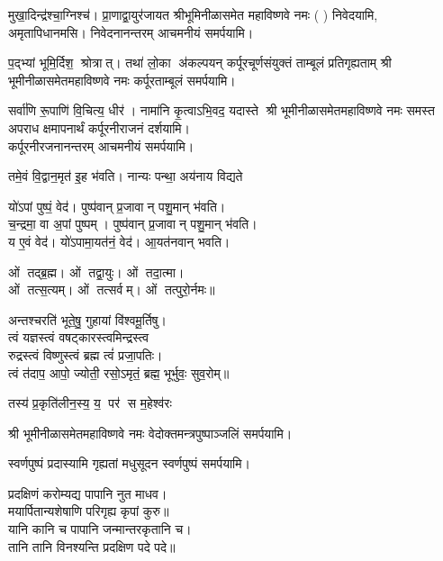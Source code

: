  {मुखा॒दिन्द्र॑श्चा॒ग्निश्च॑। प्रा॒णाद्वा॒युर॑जायत}
श्रीभूमिनीळासमेत महाविष्णवे नमः (	) निवेदयामि, \\
अमृतापिधानमसि। निवेदनानन्तरम् आचमनीयं समर्पयामि।\medskip

{प॒द्भ्यां भूमि॒र्दिश॒ श्रोत्रात्। तथा॑ लो॒का अ॑कल्पयन्}
{कर्पूरचूर्णसंयुक्तं ताम्बूलं प्रतिगृह्यताम्}
श्री भूमीनीळासमेतमहाविष्णवे नमः कर्पूरताम्बूलं समर्पयामि।\medskip

{सर्वा॑णि रू॒पाणि॑ वि॒चित्य॒ धीर॑। नामा॑नि कृ॒त्वाऽभि॒वद॒\an{} यदास्ते}
श्री भूमीनीळासमेतमहाविष्णवे नमः समस्त अपराध क्षमापनार्थं कर्पूरनीराजनं दर्शयामि।\\
कर्पूरनीरजनानन्तरम् आचमनीयं समर्पयामि।\medskip

 {तमे॒वं वि॒द्वान॒मृत॑ इ॒ह भ॑वति। नान्यः पन्था॒ अय॑नाय विद्यते}

 यो॑ऽपां पुष्पं॒ वेद॑। पुष्प॑वान् प्र॒जावान् पशु॒मान् भ॑वति।\\
च॒न्द्रमा॒ वा अ॒पां पुष्पम्। पुष्प॑वान् प्र॒जावान् पशु॒मान् भ॑वति।\\
य ए॒वं वेद॑। यो॑ऽपामा॒यत॑नं॒ वेद॑। आ॒यत॑नवान् भवति।\medskip

ओं तद्ब्र॒ह्म। ओं तद्वा॒युः। ओं तदा॒त्मा।\\ ओं तत्स॒त्यम्‌।
ओं तत्सर्वम्‌। ओं तत्पुरो॒र्नमः॥\medskip

अन्तश्चरति॑ भूते॒षु॒ गुहायां वि॑श्वमू॒र्तिषु। \\
त्वं यज्ञस्त्वं वषट्कारस्त्वमिन्द्रस्त्व\\ रुद्रस्त्वं विष्णुस्त्वं ब्रह्म त्वं॑ प्रजा॒पतिः। \\
त्वं त॑दाप॒ आपो॒ ज्योती॒ रसो॒ऽमृतं॒ ब्रह्म॒ भूर्भुवः॒ सुव॒रोम्‌॥\medskip

{तस्य॑ प्र॒कृति॑लीन॒स्य॒ य॒ पर॑ स म॒हेश्व॑रः}
\medskip

श्री भूमीनीळासमेतमहाविष्णवे नमः वेदोक्तमन्त्रपुष्पाञ्जलिं समर्पयामि।\medskip

{स्वर्णपुष्पं प्रदास्यामि गृह्यतां मधुसूदन}
स्वर्णपुष्पं समर्पयामि।\medskip

प्रदक्षिणं करोम्यद्य पापानि नुत माधव।\\
मयार्पितान्यशेषाणि परिगृह्य कृपां कुरु॥\\
 यानि कानि च पापानि जन्मान्तरकृतानि च।\\
तानि तानि विनश्यन्ति प्रदक्षिण पदे पदे॥\medskip

